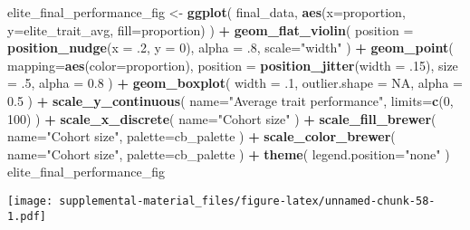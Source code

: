 \documentclass[]{book}
\newenvironment{Shaded}{\begin{snugshade}}{\end{snugshade}}
\newcommand{\DataTypeTok}[1]{\textcolor[rgb]{0.13,0.29,0.53}{#1}}
\newcommand{\DecValTok}[1]{\textcolor[rgb]{0.00,0.00,0.81}{#1}}
\newcommand{\FloatTok}[1]{\textcolor[rgb]{0.00,0.00,0.81}{#1}}
\newcommand{\KeywordTok}[1]{\textcolor[rgb]{0.13,0.29,0.53}{\textbf{#1}}}
\newcommand{\NormalTok}[1]{#1}
\newcommand{\OperatorTok}[1]{\textcolor[rgb]{0.81,0.36,0.00}{\textbf{#1}}}
\newcommand{\OtherTok}[1]{\textcolor[rgb]{0.56,0.35,0.01}{#1}}
\newcommand{\StringTok}[1]{\textcolor[rgb]{0.31,0.60,0.02}{#1}}
\begin{document}
\begin{Shaded}
\begin{Highlighting}[]
\NormalTok{elite_final_performance_fig <-}\StringTok{ }\KeywordTok{ggplot}\NormalTok{(}
\NormalTok{    final_data,}
    \KeywordTok{aes}\NormalTok{(}\DataTypeTok{x=}\NormalTok{proportion, }\DataTypeTok{y=}\NormalTok{elite_trait_avg, }\DataTypeTok{fill=}\NormalTok{proportion)}
\NormalTok{  ) }\OperatorTok{+}
\StringTok{  }\KeywordTok{geom_flat_violin}\NormalTok{(}
    \DataTypeTok{position =} \KeywordTok{position_nudge}\NormalTok{(}\DataTypeTok{x =} \FloatTok{.2}\NormalTok{, }\DataTypeTok{y =} \DecValTok{0}\NormalTok{),}
    \DataTypeTok{alpha =} \FloatTok{.8}\NormalTok{,}
    \DataTypeTok{scale=}\StringTok{"width"}
\NormalTok{  ) }\OperatorTok{+}
\StringTok{  }\KeywordTok{geom_point}\NormalTok{(}
    \DataTypeTok{mapping=}\KeywordTok{aes}\NormalTok{(}\DataTypeTok{color=}\NormalTok{proportion),}
    \DataTypeTok{position =} \KeywordTok{position_jitter}\NormalTok{(}\DataTypeTok{width =} \FloatTok{.15}\NormalTok{),}
    \DataTypeTok{size =} \FloatTok{.5}\NormalTok{,}
    \DataTypeTok{alpha =} \FloatTok{0.8}
\NormalTok{  ) }\OperatorTok{+}
\StringTok{  }\KeywordTok{geom_boxplot}\NormalTok{(}
    \DataTypeTok{width =} \FloatTok{.1}\NormalTok{,}
    \DataTypeTok{outlier.shape =} \OtherTok{NA}\NormalTok{,}
    \DataTypeTok{alpha =} \FloatTok{0.5}
\NormalTok{  ) }\OperatorTok{+}
\StringTok{  }\KeywordTok{scale_y_continuous}\NormalTok{(}
    \DataTypeTok{name=}\StringTok{"Average trait performance"}\NormalTok{,}
    \DataTypeTok{limits=}\KeywordTok{c}\NormalTok{(}\DecValTok{0}\NormalTok{, }\DecValTok{100}\NormalTok{)}
\NormalTok{  ) }\OperatorTok{+}
\StringTok{  }\KeywordTok{scale_x_discrete}\NormalTok{(}
    \DataTypeTok{name=}\StringTok{"Cohort size"}
\NormalTok{  ) }\OperatorTok{+}
\StringTok{  }\KeywordTok{scale_fill_brewer}\NormalTok{(}
    \DataTypeTok{name=}\StringTok{"Cohort size"}\NormalTok{,}
    \DataTypeTok{palette=}\NormalTok{cb_palette}
\NormalTok{  ) }\OperatorTok{+}
\StringTok{  }\KeywordTok{scale_color_brewer}\NormalTok{(}
    \DataTypeTok{name=}\StringTok{"Cohort size"}\NormalTok{,}
    \DataTypeTok{palette=}\NormalTok{cb_palette}
\NormalTok{  ) }\OperatorTok{+}
\StringTok{  }\KeywordTok{theme}\NormalTok{(}
    \DataTypeTok{legend.position=}\StringTok{"none"}
\NormalTok{  )}
\NormalTok{elite_final_performance_fig}
\end{Highlighting}
\end{Shaded}

\texttt{[image: supplemental-material\_files/figure-latex/unnamed-chunk-58-1.pdf]}
\end{document}
